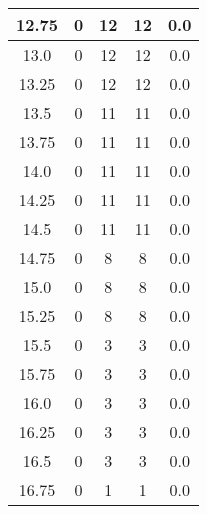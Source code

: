 \documentclass[letterpaper, 12pt]{article}
\begin{document}
\begin{longtable}{|c|c|c|c|c|}
\hline
12.75 & 0 & 12 & 12 & 0.0 \\
\hline
13.0 & 0 & 12 & 12 & 0.0 \\
\hline
13.25 & 0 & 12 & 12 & 0.0 \\
\hline
13.5 & 0 & 11 & 11 & 0.0 \\
\hline
13.75 & 0 & 11 & 11 & 0.0 \\
\hline
14.0 & 0 & 11 & 11 & 0.0 \\
\hline
14.25 & 0 & 11 & 11 & 0.0 \\
\hline
14.5 & 0 & 11 & 11 & 0.0 \\
\hline
14.75 & 0 & 8 & 8 & 0.0 \\
\hline
15.0 & 0 & 8 & 8 & 0.0 \\
\hline
15.25 & 0 & 8 & 8 & 0.0 \\
\hline
15.5 & 0 & 3 & 3 & 0.0 \\
\hline
15.75 & 0 & 3 & 3 & 0.0 \\
\hline
16.0 & 0 & 3 & 3 & 0.0 \\
\hline
16.25 & 0 & 3 & 3 & 0.0 \\
\hline
16.5 & 0 & 3 & 3 & 0.0 \\
\hline
16.75 & 0 & 1 & 1 & 0.0 \\
\hline
\end{longtable}
\end{document}

